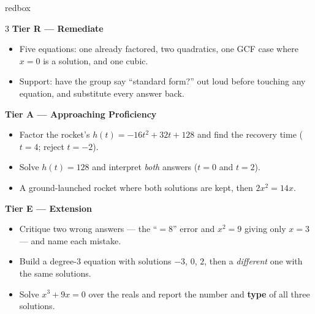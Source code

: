 \documentclass[10pt]{article}
\begin{document}
\boxguard
\begin{skillbox}{redbox}
\begin{multicols}{3}
\textbf{Tier R --- Remediate}
\begin{itemize}[leftmargin=1em, itemsep=1pt, topsep=2pt]
  \item Five equations: one already factored, two quadratics, one GCF case where $x=0$ is a
        solution, and one cubic.
  \item Support: have the group say ``standard form?'' out loud before touching any equation, and
        substitute every answer back.
\end{itemize}

\columnbreak
\textbf{Tier A --- Approaching Proficiency}
\begin{itemize}[leftmargin=1em, itemsep=1pt, topsep=2pt]
  \item Factor the rocket's $h(t)=-16t^2+32t+128$ and find the recovery time ($t=4$; reject
        $t=-2$).
  \item Solve $h(t)=128$ and interpret \emph{both} answers ($t=0$ and $t=2$).
  \item A ground-launched rocket where both solutions are kept, then $2x^2=14x$.
\end{itemize}

\columnbreak
\textbf{Tier E --- Extension}
\begin{itemize}[leftmargin=1em, itemsep=1pt, topsep=2pt]
  \item Critique two wrong answers --- the ``$=8$'' error and $x^2=9$ giving only $x=3$ --- and
        name each mistake.
  \item Build a degree-$3$ equation with solutions $-3$, $0$, $2$, then a \emph{different} one with
        the same solutions.
  \item Solve $x^3+9x=0$ over the reals and report the number and \textbf{type} of all three
        solutions.
\end{itemize}
\end{multicols}
\end{skillbox}
\end{document}
